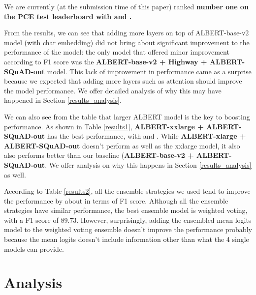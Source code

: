 \documentclass{article}
\begin{document}
We are currently (at the submission time of this paper) ranked \textbf{number one on the PCE test leaderboard with  and .}

From the results, we can see that adding more layers on top of ALBERT-base-v2 model (with char embedding) did not bring about significant improvement to the performance of the model: the only model that offered minor improvement according to F1 score was the \textbf{ALBERT-base-v2 + Highway + ALBERT-SQuAD-out} model. This lack of improvement in performance came as a surprise because we expected that adding more layers such as attention should improve the model performance. We offer detailed analysis of why this may have happened in Section \ref{results_analysis}.

We can also see from the table that larger ALBERT model is the key to boosting performance. As shown in Table \ref{results1}, \textbf{ALBERT-xxlarge + ALBERT-SQuAD-out} has the best performance, with  and . While \textbf{ALBERT-xlarge + ALBERT-SQuAD-out} doesn't perform as well as the xxlarge model, it also also performs better than our baseline (\textbf{ALBERT-base-v2 + ALBERT-SQuAD-out}. We offer analysis on why this happens in Section \ref{results_analysis} as well.

According to Table \ref{results2}, all the ensemble strategies we used tend to improve the performance by about  in terms of F1 score. Although all the ensemble strategies have similar performance, the best ensemble model is weighted voting, with a F1 score of 89.73. However, surprisingly, adding the ensembled mean logits model to the weighted voting ensemble doesn't improve the performance probably because the mean logits doesn't include information other than what the 4 single models can provide.


\section{Analysis}
\end{document}
